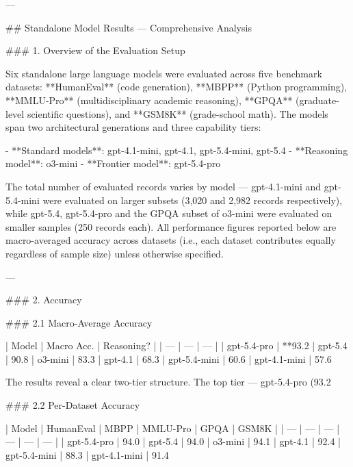 ---

## Standalone Model Results — Comprehensive Analysis

### 1. Overview of the Evaluation Setup

Six standalone large language models were evaluated across five benchmark datasets: **HumanEval** (code generation), **MBPP** (Python programming), **MMLU-Pro** (multidisciplinary academic reasoning), **GPQA** (graduate-level scientific questions), and **GSM8K** (grade-school math). The models span two architectural generations and three capability tiers:

- **Standard models**: gpt-4.1-mini, gpt-4.1, gpt-5.4-mini, gpt-5.4
- **Reasoning model**: o3-mini
- **Frontier model**: gpt-5.4-pro

The total number of evaluated records varies by model — gpt-4.1-mini and gpt-5.4-mini were evaluated on larger subsets (3,020 and 2,982 records respectively), while gpt-5.4, gpt-5.4-pro and the GPQA subset of o3-mini were evaluated on smaller samples (250 records each). All performance figures reported below are macro-averaged accuracy across datasets (i.e., each dataset contributes equally regardless of sample size) unless otherwise specified.

---

### 2. Accuracy

### 2.1 Macro-Average Accuracy

| Model | Macro Acc. | Reasoning? |
| --- | --- | --- |
| gpt-5.4-pro | **93.2%
| gpt-5.4 | 90.8%
| o3-mini | 83.3%
| gpt-4.1 | 68.3%
| gpt-5.4-mini | 60.6%
| gpt-4.1-mini | 57.6%

The results reveal a clear two-tier structure. The top tier — gpt-5.4-pro (93.2%

### 2.2 Per-Dataset Accuracy

| Model | HumanEval | MBPP | MMLU-Pro | GPQA | GSM8K |
| --- | --- | --- | --- | --- | --- |
| gpt-5.4-pro | 94.0%
| gpt-5.4 | 94.0%
| o3-mini | 94.1%
| gpt-4.1 | 92.4%
| gpt-5.4-mini | 88.3%
| gpt-4.1-mini | 91.4%

